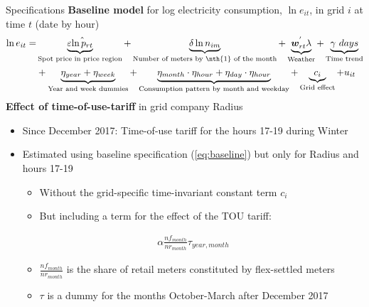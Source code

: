 \begin{frame}{Specifications}
  \textbf{Baseline model} for log electricity consumption, $\ln e_{it}$, in grid $i$ at time $t$ (date by hour)
  \begin{equation}
   \begin{split}
    \ln e_{it}=& \underbrace{\varepsilon \hat{\ln p_{rt}}}_\text{Spot price in price region}+\underbrace{\delta\ln n_{im}}_\text{Number of meters by \nth{1} of the month}+\underbrace{\bm{w}^{'}_{rt}\lambda}_\text{Weather}+\underbrace{\gamma\ days}_\text{Time trend}\\
    &+\underbrace{\eta_{year}+\eta_{week}}_\text{Year and week dummies}+\underbrace{\eta_{month}\cdot\eta_{hour}+\eta_{day}\cdot\eta_{hour}}_\text{Consumption pattern by month and weekday}+\underbrace{c_i}_\text{Grid effect}+u_{it}
   \end{split}
   \label{eq:baseline}
  \end{equation}
  \textbf{Effect of time-of-use-tariff} in grid company Radius
  \begin{itemize}
      \item Since December 2017: Time-of-use tariff for the hours 17-19 during Winter
      \item Estimated using baseline specification (\ref{eq:baseline}) but only for Radius and hours 17-19
      \begin{itemize}
          \normalsize
          \item Without the grid-specific time-invariant constant term $c_i$
          \item But including a term for the effect of the TOU tariff:
      \end{itemize}
      \begin{align}
        \alpha\frac{nf_{month}}{nr_{month}}\tau_{year,month}
        \label{eq:tout}
      \end{align}
      \begin{itemize}
        \normalsize
        \item $\frac{nf_{month}}{nr_{month}}$ is the share of retail meters constituted by flex-settled meters
        \item $\tau$ is a dummy for the months October-March after December 2017
      \end{itemize}
  \end{itemize}
\end{frame}

